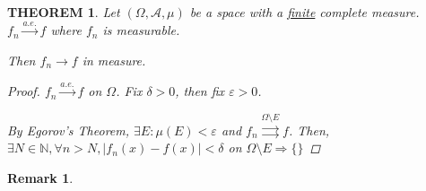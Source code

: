\documentclass[12pt]{article}
\theoremstyle{blueplain}
\newtheorem{theorem}{THEOREM}[section]
\theoremstyle{bluedef}
\theoremstyle{blueremark}
\newtheorem{remark}{Remark}[section]
\newcommand{\N}{\mathbb{N}}
\newcommand{\eps}{\varepsilon}
\numberwithin{equation}{section}
\begin{document}
\begin{theorem}
  Let $(\Omega, \mathcal{A}, \mu)$ be a space with a \underline{finite} complete measure. $f_n \overset{a.e.}{\rightarrow} f$ where $f_n$ is measurable.

  Then $f_n \rightarrow f$ in measure.
  \begin{proof}
    $f_n \overset{a.e.}{\rightarrow} f$ on $\Omega$. Fix $\delta > 0$, then fix $\eps > 0$.

    By Egorov's Theorem, $\exists E: \mu(E) < \eps$ and $f_n \overset{\Omega \setminus E}{\rightrightarrows} f$. Then, $\exists N \in \N, \forall n > N, |f_n(x) - f(x)| < \delta$ on $\Omega \setminus E \Rightarrow \{\}$









  \end{proof}
\end{theorem}

\begin{remark}

\end{remark}
\end{document}
